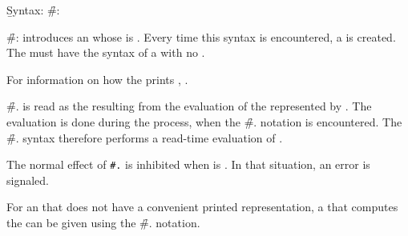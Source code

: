 \endsubsubsubsection%

\endsubsubsection%




\b{Syntax:}  \f{\#:}

\f{\#:} introduces an   whose  
is .  Every time this syntax is encountered,
a    is created.
The  must have the syntax of a  
with no .

For information on how the  
prints  ,
\seesection\PrintingSymbols.

\endsubsubsection%



\f{\#.} is read as the  resulting from the evaluation
of the  represented by .
The evaluation is done during the  process,
when the \f{\#.} notation is encountered.
The \f{\#.} syntax therefore performs a read-time evaluation of .

The normal effect of {\tt \#.} is inhibited when  is .
In that situation, an error  is signaled.

For an 
that does not have a convenient printed
representation, a  that computes the  can be given using
the \f{\#.} notation.
%

